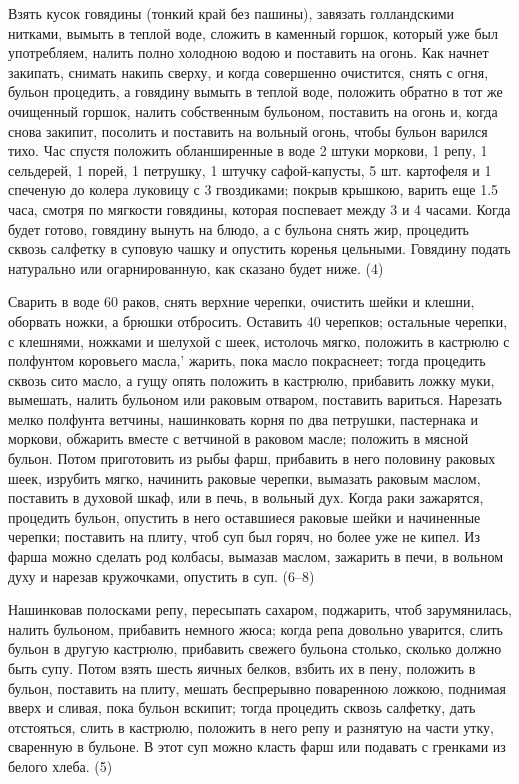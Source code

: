 
Взять кусок говядины (тонкий край без пашины), завязать голландскими нитками, вымыть в теплой воде, сложить в каменный горшок, который уже был употребляем, налить полно холодною водою и поставить на огонь. Как начнет закипать, снимать накипь сверху, и когда совершенно очистится, снять с огня, бульон процедить, а говядину вымыть в теплой воде, положить обратно в тот же очищенный горшок, налить собственным бульоном, поставить на огонь и, когда снова закипит, посолить и поставить на вольный огонь, чтобы бульон варился тихо. Час спустя положить обланширенные в воде 2 штуки моркови, 1 репу, 1 сельдерей, 1 порей, 1 петрушку, 1 штучку сафой-капусты, 5 шт. картофеля и 1 спеченую до колера луковицу с 3 гвоздиками; покрыв крышкою, варить еще 1.5 часа, смотря по мягкости говядины, которая поспевает между 3 и 4 часами. Когда будет готово, говядину вынуть на блюдо, а с бульона снять жир, процедить сквозь салфетку в суповую чашку и опустить коренья цельными. Говядину подать натурально или огарнированную, как сказано будет ниже. (4)


Сварить в воде 60 раков, снять верхние черепки, очистить шейки и клешни, оборвать ножки, а брюшки отбросить. Оставить 40 черепков; остальные черепки, с клешнями, ножками и шелухой с шеек, истолочь мягко, положить в кастрюлю с полфунтом коровьего масла,' жарить, пока масло покраснеет; тогда процедить сквозь сито масло, а гущу опять положить в кастрюлю, прибавить ложку муки, вымешать, налить бульоном или раковым отваром, поставить вариться. Нарезать мелко полфунта ветчины, нашинковать корня по два петрушки, пастернака и моркови, обжарить вместе с ветчиной в раковом масле; положить в мясной бульон. Потом приготовить из рыбы фарш, прибавить в него половину раковых шеек, изрубить мягко, начинить раковые черепки, вымазать раковым маслом, поставить в духовой шкаф, или в печь, в вольный дух. Когда раки зажарятся, процедить бульон, опустить в него оставшиеся раковые шейки и начиненные черепки; поставить на плиту, чтоб суп был горяч, но более уже не кипел. Из фарша можно сделать род колбасы, вымазав маслом, зажарить в печи, в вольном духу и нарезав кружочками, опустить в суп. (6–8)


Нашинковав полосками репу, пересыпать сахаром, поджарить, чтоб зарумянилась, налить бульоном, прибавить немного жюса; когда репа довольно уварится, слить бульон в другую кастрюлю, прибавить свежего бульона столько, сколько должно быть супу. Потом взять шесть яичных белков, взбить их в пену, положить в бульон, поставить на плиту, мешать беспрерывно поваренною ложкою, поднимая вверх и сливая, пока бульон вскипит; тогда процедить сквозь салфетку, дать отстояться, слить в кастрюлю, положить в него репу и разнятую на части утку, сваренную в бульоне. В этот суп можно класть фарш или подавать с гренками из белого хлеба. (5)

